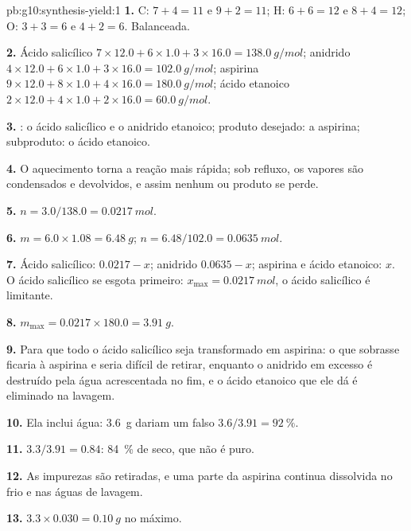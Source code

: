 \begin{solution}{pb:g10:synthesis-yield:1}
\textbf{1.} C: $7 + 4 = 11$ e $9 + 2 = 11$; H: $6 + 6 = 12$ e
$8 + 4 = 12$; O: $3 + 3 = 6$ e $4 + 2 = 6$. Balanceada.

\textbf{2.} Ácido salicílico $7 \times 12.0 + 6 \times 1.0 + 3 \times 16.0
= \qty{138.0}{g/mol}$; anidrido $4 \times 12.0 + 6 \times 1.0 +
3 \times 16.0 = \qty{102.0}{g/mol}$; aspirina $9 \times 12.0 + 8 \times
1.0 + 4 \times 16.0 = \qty{180.0}{g/mol}$; ácido etanoico $2 \times 12.0
+ 4 \times 1.0 + 2 \times 16.0 = \qty{60.0}{g/mol}$.

\textbf{3.} : o ácido salicílico e o anidrido etanoico; produto
desejado: a aspirina; subproduto: o ácido etanoico.

\textbf{4.} O aquecimento torna a reação mais rápida; sob refluxo, os
vapores são condensados e devolvidos, e assim nenhum  ou produto
se perde.

\textbf{5.} $n = 3.0 / 138.0 = \qty{0.0217}{mol}$.

\textbf{6.} $m = 6.0 \times 1.08 = \qty{6.48}{g}$;
$n = 6.48 / 102.0 = \qty{0.0635}{mol}$.

\textbf{7.} Ácido salicílico: $0.0217 - x$; anidrido $0.0635 - x$;
aspirina e ácido etanoico: $x$. O ácido salicílico se esgota primeiro:
$x_{\max} = \qty{0.0217}{mol}$, o ácido salicílico é limitante.

\textbf{8.} $m_{\max} = 0.0217 \times 180.0 = \qty{3.91}{g}$.

\textbf{9.} Para que todo o ácido salicílico seja transformado em
aspirina: o que sobrasse ficaria  à aspirina e seria difícil de
retirar, enquanto o anidrido em excesso é destruído pela água
acrescentada no fim, e o ácido etanoico que ele dá é eliminado na
lavagem.

\textbf{10.} Ela inclui água: \qty{3.6}{g} dariam um falso
$3.6 / 3.91 = \qty{92}{\percent}$.

\textbf{11.} $3.3 / 3.91 = 0.84$: \qty{84}{\percent} de 
seco, que não é puro.

\textbf{12.} As impurezas são retiradas, e uma parte da aspirina continua
dissolvida no  frio e nas águas de lavagem.

\textbf{13.} $3.3 \times 0.030 = \qty{0.10}{g}$ no máximo.


\end{solution}
